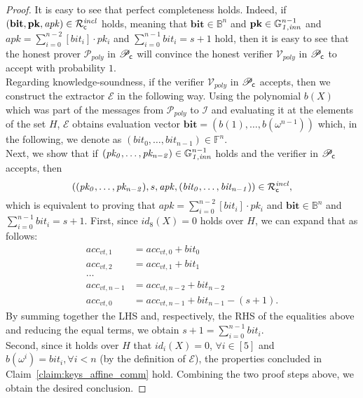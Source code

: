 \begin{proof}
It is easy to see that perfect completeness holds. Indeed, if $(\mathbf{bit},\mathbf{pk}, \mathit{apk}) \in \mathcal{R}^{\mathit{incl}}_{\mathsf{c}}$ holds, 
meaning that $\mathbf{bit} \in \mathbb{B}^n$ and $\mathbf{pk} \in \mathbb{G}_{\mathit{1,inn}}^{n-1}$ and $\mathit{apk} = \sum_{i=0}^{n-2} [\mathit{bit_i}] \cdot \mathit{pk_i}$ and 
$\sum_{i=0}^{n-1} \mathit{bit_i} = s+1$ hold, then it is easy to see that the honest prover $\mathcal{P}_{poly}$ in $\mathscr{P}_{\mathsf{c}}$ will convince the honest 
verifier $\mathcal{V}_{poly}$ in $\mathscr{P}_{\mathsf{c}}$ to accept with probability $1$. \\
Regarding knowledge-soundness, if the verifier $\mathcal{V}_{poly}$ in $\mathscr{P}_{\mathsf{c}}$ accepts, 
then we construct the extractor $\mathcal{E}$ in the following way. Using the polynomial $b(X)$ which 
was part of the messages from $\mathcal{P}_{poly}$ to $\mathcal{I}$ and evaluating it at the elements of the set 
$H$, $\mathcal{E}$ obtains evaluation vector $\mathbf{bit} = (b(1), \ldots, b(\omega^{n-1}))$ which, 
in the following, we denote as $(\mathit{bit}_0, \ldots, \mathit{bit}_{n-1}) \in \mathbb{F}^n$.\\ 
\noindent Next, we show that if $(\mathit{pk_0}, \ldots, \mathit{pk_{n-2}}) \in \mathbb{G}_{\mathit{1,inn}}^{n-1}$ holds and the 
verifier in $\mathscr{P}_{\mathsf{c}}$ accepts, then 
$$((\mathit{pk_0}, \ldots, \mathit{pk_{n-2}}), s, \mathit{apk}, (\mathit{bit_0}, \ldots, \mathit{bit_{n-1}})) \in \mathcal{R}^{\mathit{incl}}_{\mathsf{c}},$$ 
which is equivalent to proving that $\mathit{apk} = \sum_{i=0}^{n-2} [\mathit{bit_i}]  \cdot \mathit{pk_i}$ and 
$\mathbf{bit} \in \mathbb{B}^n$ and  $\sum_{i=0}^{n-1} \mathit{bit_i} = s+1$.
\noindent First, since $id_8(X) = 0$ holds over $H$, we can expand that as follows:
\begin{align*}
acc_{vt,1} &= acc_{vt,0} + \mathit{bit}_{0} \\
acc_{vt, 2} &= acc_{vt,1} + \mathit{bit}_{1} \\
\ldots \\
acc_{vt,n-1} &= acc_{vt,n-2} + \mathit{bit}_{n-2} \\
acc_{vt,0} &= acc_{vt,n-1} + \mathit{bit}_{n-1} - (s+1).
\end{align*}
\noindent By summing together the LHS and, respectively, the RHS of the equalities above and 
reducing the equal terms, we obtain $s+1 = \sum_{i=0}^{n-1}\mathit{bit}_i$. \\ 
Second, since it holds over $H$ that $id_i(X) = 0$, $\forall i \in [5]$ and $b(\omega^i) = \mathit{bit_i}, \forall i<n$ (by the definition 
of $\mathcal{E}$), the properties concluded in Claim~\ref{claim:keys_affine_comm} hold. Combining the two proof steps above, we obtain the desired conclusion.
\end{proof}

